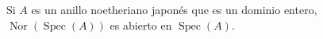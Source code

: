\begin{corollary}[6.13.3]
\label{IV.2.s6.13.3-fr}
Si $A$ es un anillo noetheriano japonés que es un dominio entero,
$\operatorname{Nor}(\operatorname{Spec}(A))$ es abierto en
$\operatorname{Spec}(A)$.
\end{corollary}
